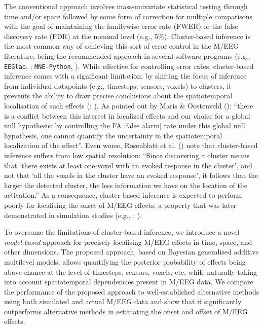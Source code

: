 \documentclass[
  doc,
  floatsintext,
  longtable,
  a4paper,
  nolmodern,
  notxfonts,
  notimes,
  donotrepeattitle,
  colorlinks=true,linkcolor=blue,citecolor=blue,urlcolor=blue]{apa7}
\begin{document}
The conventional approach involves mass-univariate statistical testing
through time and/or space followed by some form of correction for
multiple comparisons with the goal of maintaining the familywise error
rate (FWER) or the false discovery rate (FDR) at the nominal level
(e.g., 5\%). Cluster-based inference is the most common way of achieving
this sort of error control in the M/EEG literature, being the
recommended approach in several software programs (e.g.,
\texttt{EEGlab}, ;
\texttt{MNE-Python}, ). While
effective for controlling error rates, cluster-based inference comes
with a significant limitation: by shifting the focus of inference from
individual datapoints (e.g., timesteps, sensors, voxels) to clusters, it
prevents the ability to draw precise conclusions about the
spatiotemporal localisation of such effects
(;
). As
pointed out by Maris \& Oostenveld ():
``there is a conflict between this interest in localized effects and our
choice for a global null hypothesis: by controlling the FA {[}false
alarm{]} rate under this global null hypothesis, one cannot quantify the
uncertainty in the spatiotemporal localization of the effect''. Even
worse, Rosenblatt et al. () note that
cluster-based inference suffers from low spatial resolution: ``Since
discovering a cluster means that `there exists at least one voxel with
an evoked response in the cluster', and not that `all the voxels in the
cluster have an evoked response', it follows that the larger the
detected cluster, the less information we have on the location of the
activation.'' As a consequence, cluster-based inference is expected to
perform poorly for localising the onset of M/EEG effects; a property
that was later demonstrated in simulation studies (e.g.,
;
).

To overcome the limitations of cluster-based inference, we introduce a
novel \emph{model-based} approach for precisely localising M/EEG effects
in time, space, and other dimensions. The proposed approach, based on
Bayesian generalised additive multilevel models, allows quantifying the
posterior probability of effects being above chance at the level of
timesteps, sensors, voxels, etc, while naturally taking into account
spatiotemporal dependencies present in M/EEG data. We compare the
performance of the proposed approach to well-established alternative
methods using both simulated and actual M/EEG data and show that it
significantly outperforms alternative methods in estimating the onset
and offset of M/EEG effects.
\end{document}
